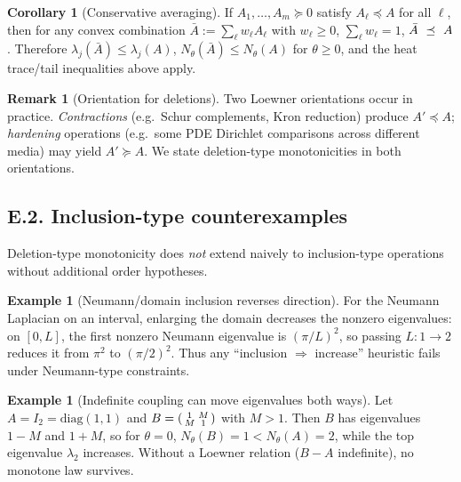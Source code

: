 \documentclass[11pt]{article}
\numberwithin{equation}{section}
\theoremstyle{plain}
\theoremstyle{definition}
\theoremstyle{remark}
\theoremstyle{plain}
\theoremstyle{definition}
\numberwithin{equation}{section}
\newtheorem{corollary}[theorem]{Corollary}
\theoremstyle{definition}
\newtheorem{example}[theorem]{Example}
\newtheorem{remark}[theorem]{Remark}
\numberwithin{equation}{section}
\theoremstyle{plain}
\theoremstyle{definition}
\theoremstyle{remark}
\providecommand{\n}{\unskip\space}
\begin{document}
\begin{corollary}[Conservative averaging]\label{E:cor:avg}
If \(A_1,\dots,A_m\succeq 0\) satisfy \(A_\ell\preceq A\) for all \(\ell\), then for any convex combination \(\bar A:=\sum_\ell w_\ell A_\ell\) with \(w_\ell\ge 0\), \(\sum_\ell w_\ell=1\),
\(\n\bar A\ \preceq\ A\n\).
Therefore \(\lambda_j(\bar A)\le \lambda_j(A)\), \(N_\theta(\bar A)\le N_\theta(A)\) for \(\theta\ge 0\), and the heat trace/tail inequalities above apply.
\end{corollary}

\begin{remark}[Orientation for deletions]
Two Loewner orientations occur in practice.
\emph{Contractions} (e.g.\ Schur complements, Kron reduction) produce \(A'\preceq A\); \emph{hardening} operations (e.g.\ some PDE Dirichlet comparisons across different media) may yield \(A'\succeq A\).
We state deletion-type monotonicities in both orientations.
\end{remark}

\subsection*{E.2. Inclusion-type counterexamples}

Deletion-type monotonicity does \emph{not} extend naively to inclusion-type operations without additional order hypotheses.

\begin{example}[Neumann/domain inclusion reverses direction]\label{E:ex:neumann}
For the Neumann Laplacian on an interval, enlarging the domain decreases the nonzero eigenvalues:
on \([0,L]\), the first nonzero Neumann eigenvalue is \((\pi/L)^2\), so passing \(L:1\to 2\) reduces it from \(\pi^2\) to \((\pi/2)^2\).
Thus any “inclusion \(\Rightarrow\) increase” heuristic fails under Neumann-type constraints.
\end{example}

\begin{example}[Indefinite coupling can move eigenvalues both ways]\label{E:ex:indef}
Let \(A=I_2=\mathrm{diag}(1,1)\) and
\(B=\begin{psmallmatrix}1 & M\\ M & 1\end{psmallmatrix}\) with \(M>1\).
Then \(B\) has eigenvalues \(1-M\) and \(1+M\), so for \(\theta=0\),
\(N_\theta(B)=1<N_\theta(A)=2\), while the top eigenvalue \(\lambda_2\) increases.
Without a Loewner relation (\(B-A\) indefinite), no monotone law survives.
\end{example}
\end{document}
